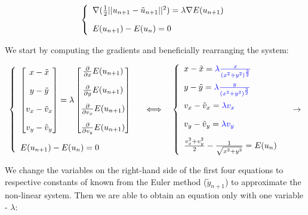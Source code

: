 \documentclass[11pt]{article}
\begin{document}
\[
\left\{ \begin{array}{lcl}
\nabla (\frac{1}{2}||{u_{n+1}} - \tilde{u} _{n+1}||^2) = \lambda \nabla E(u_{n+1}) \\[10pt]
E(u_{n+1}) - E(u_n) = 0
\end{array} \right.\displaystyle 
\]

We start by computing the gradients and beneficially rearranging the system:

\[
\left\{ \begin{array}{lcl}
\begin {bmatrix}
x - \tilde{x} \\[10pt]
y - \tilde{y} \\[10pt]
v_x - \tilde{v}_x\\[10pt]
v_y - \tilde{v}_y
\end{bmatrix} = 
\lambda \begin {bmatrix}
\frac{\partial}{\partial x}E(u_{n+1})\\[10pt]
\frac{\partial}{\partial y}E(u_{n+1}) \\[10pt]
\frac{\partial}{\partial v_x}E(u_{n+1}) \\[10pt]
\frac{\partial}{\partial v_y}E(u_{n+1})
\end{bmatrix} \\[45pt]
E(u_{n+1}) - E(u_n) = 0
\end{array} \right.\displaystyle 
\quad \Longleftrightarrow \quad
\left\{ \begin{array}{lcl}
x - \tilde{x} = \color{blue}{\lambda \frac{x}{(x^2 + y^2)^\frac{3}{2}}} \\[10pt]
y - \tilde{y} = \color{blue}{\lambda \frac{y}{(x^2 + y^2)^\frac{3}{2}}} \\[10pt]
v_x - \tilde{v}_x = \color{blue}{\lambda v_x} \\[10pt]
v_y - \tilde{v}_y = \color{blue}{\lambda v_y} \\[10pt]
\frac{v_x ^2 + v_y ^ 2}{2} - \frac{1}{\sqrt{x^2 + y^2}} = E(u_n)
\end{array} \right.\displaystyle 
\quad \rightarrow
\]

We change the variables on the right-hand side of the first four equations to respective constants of known from the Euler method ($\tilde{y} _{n+1}$) to approximate the non-linear system. Then we are able to obtain an equation only with one variable - $\lambda$:
\end{document}
